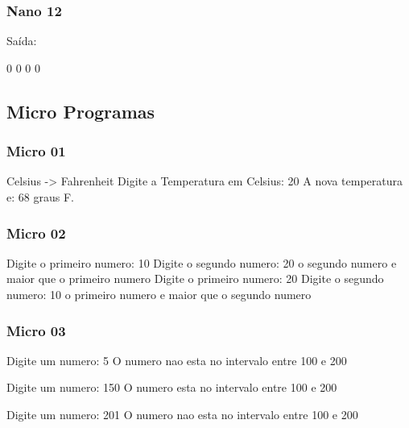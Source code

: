 \documentclass[12pt,a4paper,twoside]{report}
\begin{document}
\subsubsection{Nano 12}


Saída:
\begin{terminal}
0
0
0
0
\end{terminal}

\subsection{Micro Programas}
\subsubsection{Micro 01}


\begin{terminal}
Celsius -> Fahrenheit
Digite a Temperatura em Celsius: 20
A nova temperatura e: 68 graus F.
\end{terminal}

\subsubsection{Micro 02}


\begin{terminal}
Digite o primeiro numero: 10
Digite o segundo numero: 20
o segundo numero e maior que o primeiro numero
Digite o primeiro numero: 20
Digite o segundo numero: 10
o primeiro numero e maior que o segundo numero
\end{terminal}

\subsubsection{Micro 03}


\begin{terminal}
Digite um numero: 5
O numero nao esta no intervalo entre 100 e 200

Digite um numero: 150
O numero esta no intervalo entre 100 e 200

Digite um numero: 201
O numero nao esta no intervalo entre 100 e 200
\end{terminal}
\end{document}
